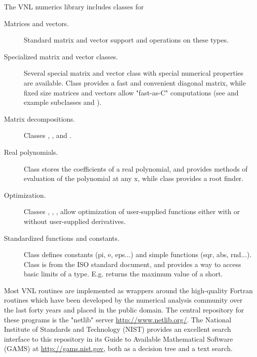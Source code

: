 The VNL numerics library includes classes for 
\begin{description}
        \item[Matrices and vectors.] Standard matrix and vector support
        and operations on these types.

        \item[Specialized matrix and vector classes.] Several special matrix
        and vector class with special numerical properties are
        available. Class  provides a fast and
        convenient diagonal matrix, while fixed size matrices and vectors
        allow "fast-as-C" computations (see  
        and example subclasses  and 
        ).

        \item[Matrix decompositions.] Classes , 
        , and 
        . 

        \item[Real polynomials.] Class  stores 
        the coefficients of a real polynomial, and provides methods of 
        evaluation of the polynomial at any x, while class 
         provides a root finder. 

        \item[Optimization.] Classes ,
        , ,
         allow optimization of user-supplied
        functions either with or without user-supplied derivatives.

        \item[Standardized functions and constants.] Class 
        defines constants (pi, e, eps...) and simple functions (sqr, abs,
        rnd...). Class  is from the ISO standard
        document, and provides a way to access basic limits of a
        type. E.g.  returns the maximum
        value of a short.
\end{description}

Most VNL routines are implemented as wrappers around the high-quality Fortran
routines which have been developed by the numerical analysis community over
the last forty years and placed in the public domain. The central repository
for these programs is the "netlib" server \url{http://www.netlib.org/}. The
National Institute of Standards and Technology (NIST) provides an excellent
search interface to this repository in its Guide to Available Mathematical
Software (GAMS) at \url{http://gams.nist.gov}, both as a decision tree and a
text search.

